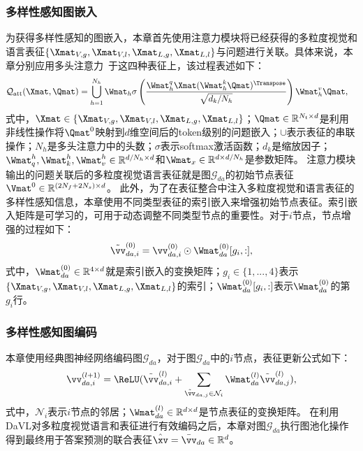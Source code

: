 \subsubsection{多样性感知图嵌入}
为获得多样性感知的图嵌入，本章首先使用注意力模块将已经获得的多粒度视觉和语言表征$\{\Xmat_{V, g}, \Xmat_{V, l}, \Xmat_{L, g}, \Xmat_{L, l}\}$与问题进行关联。具体来说，本章分别应用多头注意力~\cite{vaswani2017attention}于这四种表征上，该过程表述如下：
\begin{equation}
\begin{aligned}
&\mathcal{Q}_{\text{att}}(\Xmat, \Qmat) = \bigcup_{h=1}^{N_h} \Wmat_h \sigma \left(\frac{\Wmat_h^q\Xmat(\Wmat_h^k \Qmat)^{\Transpose}}{\sqrt{d_k/N_h}}\right) \Wmat_h^v \Qmat, 
\label{eq:alpha_ij}
\end{aligned}
\end{equation} 
式中，$\Xmat \in \{\Xmat_{V, g}, \Xmat_{V, l}, \Xmat_{L, g}, \Xmat_{L, l}\}$；$\Qmat \in \mathbb{R}^{N_t \times d}$是利用非线性操作将$\Qmat^{0}$映射到$d$维空间后的token级别的问题嵌入；$\cup$表示表征的串联操作；$N_h$是多头注意力中的头数；$\sigma$表示softmax激活函数；$d_k$是缩放因子；$\Wmat_q^h, \Wmat_k^h, \Wmat_v^h \in \mathbb{R}^{d/N_h \times d}$和$\Wmat_x \in \mathbb{R}^{d \times d/N_h}$是参数矩阵。
注意力模块输出的问题关联后的多粒度视觉语言表征就是图$\mathcal{G}_{da}$的初始节点表征$\Vmat^{0} \in \mathbb{R}^{(2N_f + 2N_s) \times d}$。
此外，为了在表征整合中注入多粒度视觉和语言表征的多样性感知信息，本章使用不同类型表征的索引嵌入来增强初始节点表征。索引嵌入矩阵是可学习的，可用于动态调整不同类型节点的重要性。对于$i$节点，节点增强的过程如下：
\begin{equation} 
\tilde{\vv}_{da, i}^{(0)} = \vv_{da, i}^{(0)} \odot \Wmat_{da}^{(0)}[g_i, :],
\end{equation}
式中，$\Wmat_{da}^{(0)} \in \mathbb{R}^{4 \times d}$就是索引嵌入的变换矩阵；$g_i \in \{1, ..., 4\}$表示$\{\Xmat_{V, g}, \Xmat_{V, l}, \Xmat_{L, g}, \Xmat_{L, l}\}$的索引；$\Wmat_{da}^{(0)}[g_i, :]$表示$\Wmat_{da}^{(0)}$的第$g_i$行。


\subsubsection{多样性感知图编码}
本章使用经典图神经网络编码图$\mathcal{G}_{da}$，对于图$\mathcal{G}_{da}$中的$i$节点，表征更新公式如下：
\begin{equation}
\vv_{da, i}^{(l+1)} = \ReLU (\tilde{\vv}_{da, i}^{(l)} + \sum_{\tilde{\vv}_{da, j} \in \mathcal{N}_i} \Wmat_{da}^{(l)} \tilde{\vv}_{da, j}^{(l)}),
\label{eq:da_GCN}
\end{equation}
式中，$\mathcal{N}_i$表示$i$节点的邻居；$\Wmat_{da}^{(l)}\in \mathbb{R}^{d\times d}$是节点表征的变换矩阵。
在利用DaVL对多粒度视觉语言和表征进行有效编码之后，本章对图$\mathcal{G}_{da}$执行图池化操作得到最终用于答案预测的联合表征$\hat{\xv} = \bar{\vv}_{da} \in \mathbb{R}^d$。


